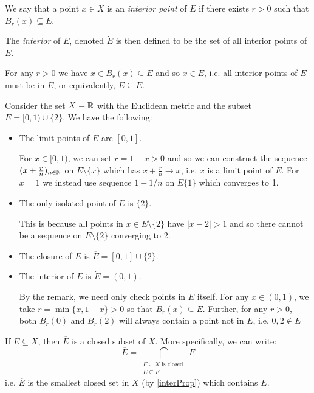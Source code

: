 \documentclass[../main.tex]{subfiles}
\begin{document}
\begin{definition}[Interior]
  We say that a point $x \in X$ is an \textit{interior point} of $E$ if there exists $r > 0$ such that $B_r(x) \subseteq E$.

  The \textit{interior} of $E$, denoted $\dot{E}$ is then defined to be the set of all interior points of $E$.
\end{definition}
\begin{remark}
  For any $r > 0$ we have $x \in B_r(x) \subseteq E$ and so $x \in E$, i.e. all interior points of $E$ must be in $E$, or equivalently, $\dot{E} \subseteq E$.
\end{remark}
\begin{example}
  Consider the set $X = \mathbb{R}$ with the Euclidean metric and the subset $E = [0, 1) \cup \{2\}$.
  We have the following:
  \begin{itemize}
    \item The limit points of $E$ are $[0, 1]$.

      For $x \in [0, 1)$, we can set $r = 1 - x > 0$ and so we can construct the sequence $(x + \frac{r}{n})_{n \in \mathbb{N}}$ on $E \setminus \{x\}$ which has $x + \frac{r}{n} \to x$, i.e. $x$ is a limit point of $E$.
      For $x = 1$ we instead use sequence $1 - 1/n$ on $E \{1\}$ which converges to 1.
    \item The only isolated point of $E$ is $\{2\}$.

      This is because all points in $x \in E \setminus \{2\}$ have $|x - 2| > 1$ and so there cannot be a sequence on $E \setminus \{2\}$ converging to 2.
    \item The closure of $E$ is $\overline{E} = [0, 1] \cup \{2\}$.
    \item The interior of $E$ is $\dot{E} = (0, 1)$.

      By the remark, we need only check points in $E$ itself.
      For any $x \in (0, 1)$, we take $r = \min\{x, 1 - x\} > 0$ so that $B_r(x) \subseteq E$.
      Further, for any $r > 0$, both $B_r(0)$ and $B_r(2)$ will always contain a point not in $E$, i.e. $0, 2 \notin \dot{E}$
  \end{itemize}
\end{example}
\begin{proposition}
  If $E \subseteq X$, then $\overline{E}$ is a closed subset of $X$.
  More specifically, we can write: \label{closureInter}
  \[
    \overline{E} = \bigcap_{\substack{F \subseteq X \text{ is closed }\\ E \subseteq F}} F
  \]
  i.e. $\overline{E}$ is the smallest closed set in $X$ (by \cref{interProp}) which contains $E$.
\end{proposition}
\end{document}
